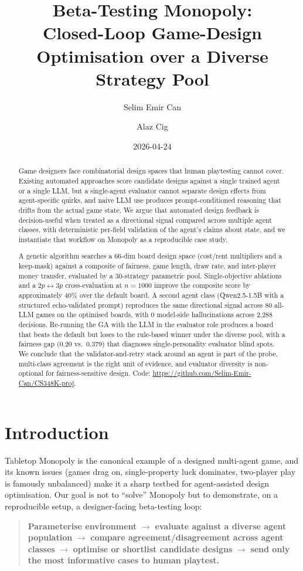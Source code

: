 \documentclass[10pt]{article}
\title{Beta-Testing Monopoly: \\Closed-Loop Game-Design Optimisation
       over a Diverse Strategy Pool}
\author{Selim Emir Can \and Alaz Cig}
\date{2026-04-24}
\begin{document}
\maketitle

\begin{abstract}
Game designers face combinatorial design spaces that human
playtesting cannot cover. Existing automated approaches score
candidate designs against a single trained agent or a single LLM,
but a single-agent evaluator cannot separate design effects from
agent-specific quirks, and naive LLM use produces prompt-conditioned
reasoning that drifts from the actual game state. We argue that
automated design feedback is decision-useful when treated as a
directional signal compared across multiple agent classes, with
deterministic per-field validation of the agent's claims about
state, and we instantiate that workflow on Monopoly as a
reproducible case study.

A genetic algorithm searches a 66-dim board design space (cost/rent
multipliers and a keep-mask) against a composite of fairness, game
length, draw rate, and inter-player money transfer, evaluated by a
30-strategy parametric pool. Single-objective ablations and a
$2p\!\leftrightarrow\!3p$ cross-evaluation at $n{=}1000$ improve the
composite score by approximately 40\% over the default board. A
second agent class (Qwen2.5-1.5B with a structured echo-validated
prompt) reproduces the same directional signal across 80 all-LLM
games on the optimised boards, with 0 model-side hallucinations
across 2{,}288 decisions. Re-running the GA with the LLM in the
evaluator role produces a board that beats the default but loses to
the rule-based winner under the diverse pool, with a fairness gap
(0.20 vs.\ 0.379) that diagnoses single-personality evaluator blind
spots. We conclude that the validator-and-retry stack around an
agent is part of the probe, multi-class agreement is the right unit
of evidence, and evaluator diversity is non-optional for
fairness-sensitive design.
Code: \url{https://github.com/Selim-Emir-Can/CS348K-proj}.
\end{abstract}

\section{Introduction}

Tabletop Monopoly is the canonical example of a designed multi-agent game,
and its known issues (games drag on, single-property luck dominates,
two-player play is famously unbalanced) make it a sharp testbed for
agent-assisted design optimisation. Our goal is not to ``solve'' Monopoly
but to demonstrate, on a reproducible setup, a designer-facing
beta-testing loop:
\begin{quote}
\textbf{Parameterise environment} $\to$ \textbf{evaluate against a diverse
agent population} $\to$ \textbf{compare agreement/disagreement across
agent classes} $\to$ \textbf{optimise or shortlist candidate designs}
$\to$ \textbf{send only the most informative cases to human playtest.}
\end{quote}
\end{document}
